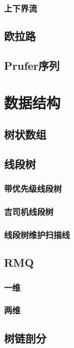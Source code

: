 \documentclass[twocolumn,a4]{article}
\newcommand{\addcpp}[1]{}
\begin{document}
		\subsubsection{上下界流}
	\subsection{欧拉路}
		\addcpp{graph/euler_path}
	\subsection{Prufer序列}

\section{数据结构}
	\subsection{树状数组}
	\subsection{线段树}
		\subsubsection{带优先级线段树}
		\subsubsection{吉司机线段树}
			\addcpp{datastruct/minSeg}
		\subsubsection{线段树维护扫描线}
	\subsection{RMQ}
		\subsubsection{一维}
		\subsubsection{两维}
	\subsection{树链剖分}
\end{document}
